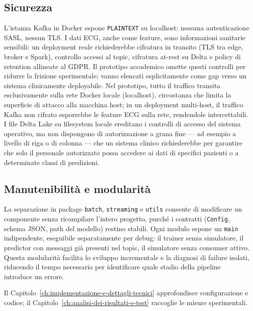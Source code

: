 \subsection{Sicurezza}

L'istanza Kafka in Docker espone \texttt{PLAINTEXT} su localhost: nessuna autenticazione SASL, nessun TLS.
I dati ECG, anche come feature, sono informazioni sanitarie sensibili: un deployment reale richiederebbe cifratura in transito (TLS tra edge, broker e Spark), controllo accessi al topic, cifratura at-rest su Delta e policy di retention allineate al GDPR.
Il prototipo accademico omette questi controlli per ridurre la frizione sperimentale; vanno elencati esplicitamente come gap verso un sistema clinicamente deployabile.
Nel prototipo, tutto il traffico transita esclusivamente sulla rete Docker locale (localhost), circostanza che limita la superficie di attacco alla macchina host; in un deployment multi-host, il traffico Kafka non cifrato esporrebbe le feature ECG sulla rete, rendendole intercettabili.
I file Delta Lake su filesystem locale ereditano i controlli di accesso del sistema operativo, ma non dispongono di autorizzazione a grana fine --- ad esempio a livello di riga o di colonna --- che un sistema clinico richiederebbe per garantire che solo il personale autorizzato possa accedere ai dati di specifici pazienti o a determinate classi di predizioni.

\subsection{Manutenibilità e modularità}

La separazione in package \texttt{batch}, \texttt{streaming} e \texttt{utils} consente di modificare un componente senza ricompilare l'intero progetto, purché i contratti (\texttt{Config}, schema JSON, path del modello) restino stabili.
Ogni modulo espone un \texttt{main} indipendente, eseguibile separatamente per debug: il trainer senza simulatore, il predictor con messaggi già presenti nel topic, il simulatore senza consumer attivo.
Questa modularità facilita lo sviluppo incrementale e la diagnosi di failure isolati, riducendo il tempo necessario per identificare quale stadio della pipeline introduce un errore.

Il Capitolo~\ref{ch:implementazione-e-dettagli-tecnici} approfondisce configurazione e codice; il Capitolo~\ref{ch:analisi-dei-risultati-e-test} raccoglie le misure sperimentali.
